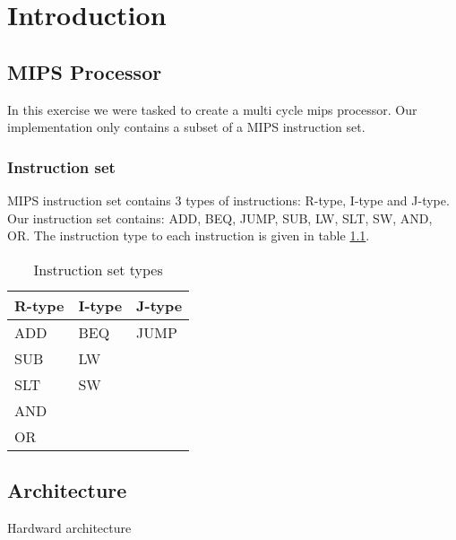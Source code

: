 \chapter{Introduction}

\section{MIPS Processor}
In this exercise we were tasked to create a multi cycle mips processor. Our implementation only contains a subset of a MIPS instruction set.

\subsection{Instruction set}
MIPS instruction set contains 3 types of instructions: R-type, I-type and J-type. Our instruction set contains: ADD, BEQ, JUMP, SUB, LW, SLT, SW, AND, OR. The instruction type to each instruction is given in table \ref{table:instruction-types}.

\begin{table}
\centering
\begin{tabular}{ |l|l|l| }
  \hline
  R-type & I-type & J-type \\
  \hline
  ADD & BEQ & JUMP \\
  SUB & LW & \\
  SLT & SW & \\
  AND & & \\
  OR & & \\
  \hline
\end{tabular}
\caption{Instruction set types}
\label{table:instruction-types}
\end{table}

\section{Architecture}
Hardward architecture

